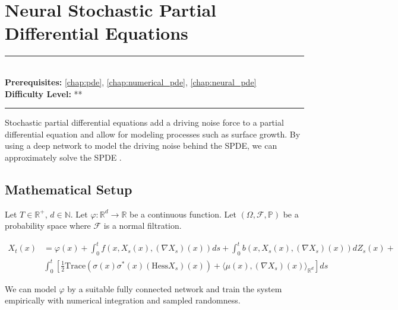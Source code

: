 \documentclass[book.tex]{subfiles}
\begin{document}
\chapter{Neural Stochastic Partial Differential Equations}

\label{chap:neural_spde}
\noindent\rule{11cm}{0.4pt} \\
\textbf{Prerequisites:}  \autoref{chap:pde}, \autoref{chap:numerical_pde}, \autoref{chap:neural_pde}  \\
\textbf{Difficulty Level:} ** \\
\noindent\rule{11cm}{0.4pt}
\vspace{5mm}

Stochastic partial differential equations add a driving noise force to a partial differential equation and allow for modeling processes such as surface growth. By using a deep network to model the driving noise behind the SPDE, we can approximately solve the SPDE \cite{beck2020deep}.

\section{Mathematical Setup}

Let $T \in \mathbb{R}^+$, $d \in \mathbb{N}$. Let $\varphi: \mathbb{R}^d \to \mathbb{R}$ be a continuous function. Let $(\Omega, \mathcal{F}, \mathbb{P})$ be a probability space where $\mathcal{F}$ is a normal filtration. %

\begin{align}
    X_t(x) &= \varphi(x) + \int_0^t f(x, X_s(x),(\nabla X_s)(x)) ds + \int_0^t b(x, X_s(x), (\nabla X_s)(x)) dZ_s(x) + \\ & \int_0^t \left [ \frac{1}{2} \mathrm{Trace}(\sigma(x)\sigma^*(x)(\mathrm{Hess} X_s)(x)) + \langle \mu(x), (\nabla X_s)(x) \rangle_{\mathbb{R}^d} \right] ds
\end{align}

We can model $\varphi$ by a suitable fully connected network and train the system empirically with numerical integration and sampled randomness.
\end{document}
